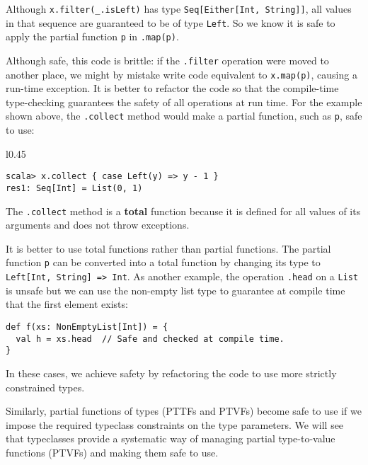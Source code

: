 \noindent Although \lstinline!x.filter(_.isLeft)! has type \lstinline!Seq[Either[Int, String]]!,
all values in that sequence are guaranteed to be of type \lstinline!Left!.
So we know it is safe to apply the partial function \lstinline!p!
in \lstinline!.map(p)!. 

Although safe, this code is brittle: if the \lstinline!.filter! operation
were moved to another place, we might by mistake write code equivalent
to \lstinline!x.map(p)!, causing a run-time exception. It is better
to refactor the code so that the compile-time type-checking guarantees
the safety of all operations at run time. For the example shown above,
the \lstinline!.collect! method would make a partial function, such
as \lstinline!p!, safe to use:

\begin{wrapfigure}{l}{0.45\columnwidth}%
\vspace{-0.75\baselineskip}
\begin{lstlisting}
scala> x.collect { case Left(y) => y - 1 }
res1: Seq[Int] = List(0, 1)
\end{lstlisting}

\vspace{-0.75\baselineskip}
\end{wrapfigure}%

\noindent The \lstinline!.collect! method is a \textbf{total}
function because it is defined for all values of its arguments and
does not throw exceptions. 

It is better to use total functions rather than partial functions.
The partial function \lstinline!p! can be converted into a total
function by changing its type to \lstinline!Left[Int, String] => Int!.
As another example, the operation \lstinline!.head! on a \lstinline!List!
is unsafe but we can use the non-empty list type to guarantee at compile
time that the first element exists:
\begin{lstlisting}
def f(xs: NonEmptyList[Int]) = {
  val h = xs.head  // Safe and checked at compile time.
}
\end{lstlisting}

In these cases, we achieve safety by refactoring the code to use more
strictly constrained types.

Similarly, partial functions of types (PTTFs and PTVFs) become safe
to use if we impose the required typeclass constraints on the type
parameters. We will see that typeclasses provide a systematic way
of managing partial type-to-value functions (PTVFs) and making them
safe to use.

